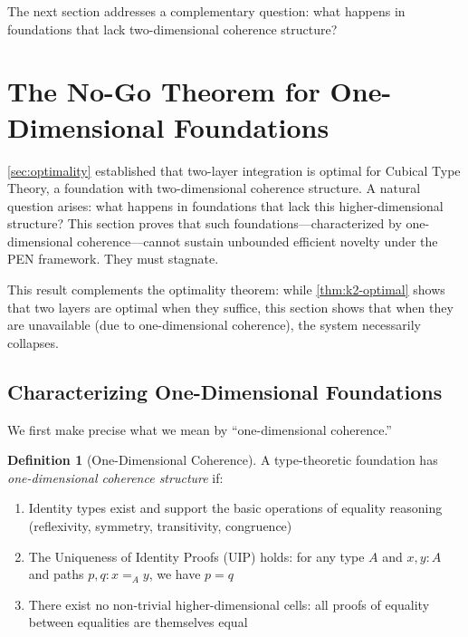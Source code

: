 \documentclass[11pt]{article}
\theoremstyle{definition}
\newtheorem{definition}[theorem]{Definition}
\theoremstyle{remark}
\begin{document}
The next section addresses a complementary question: what happens in foundations that lack
two-dimensional coherence structure?

\section{The No-Go Theorem for One-Dimensional Foundations}
\label{sec:nogo}

\cref{sec:optimality} established that two-layer integration is optimal for Cubical Type Theory, a foundation with two-dimensional coherence structure. A natural question arises: what happens in foundations that lack this higher-dimensional structure? This section proves that such foundations---characterized by one-dimensional coherence---cannot sustain unbounded efficient novelty under the PEN framework. They must stagnate.

This result complements the optimality theorem: while \cref{thm:k2-optimal} shows that two layers are optimal when they suffice, this section shows that when they are unavailable (due to one-dimensional coherence), the system necessarily collapses.

\subsection{Characterizing One-Dimensional Foundations}

We first make precise what we mean by ``one-dimensional coherence.''

\begin{definition}[One-Dimensional Coherence]
\label{def:1d-coherence}
A type-theoretic foundation has \emph{one-dimensional coherence structure} if:
\begin{enumerate}
\item Identity types exist and support the basic operations of equality reasoning (reflexivity, symmetry, transitivity, congruence)
\item The Uniqueness of Identity Proofs (UIP) holds: for any type $A$ and $x, y : A$ and paths $p, q : x =_A y$, we have $p = q$
\item There exist no non-trivial higher-dimensional cells: all proofs of equality between equalities are themselves equal
\end{enumerate}
\end{definition}
\end{document}
